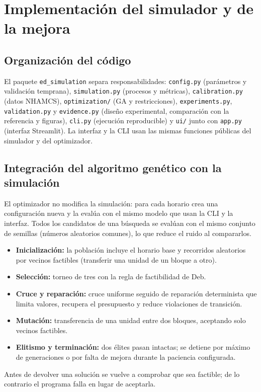 \section{Implementación del simulador y de la mejora}

\subsection{Organización del código}
El paquete \texttt{ed\_simulation} separa responsabilidades: \texttt{config.py}
(parámetros y validación temprana), \texttt{simulation.py} (procesos y métricas),
\texttt{calibration.py} (datos NHAMCS), \texttt{optimization/} (GA y restricciones),
\texttt{experiments.py}, \texttt{validation.py} y \texttt{evidence.py} (diseño
experimental, comparación con la referencia y figuras), \texttt{cli.py} (ejecución
reproducible) y \texttt{ui/} junto con \texttt{app.py} (interfaz Streamlit). La interfaz y
la CLI usan las mismas funciones públicas del simulador y del optimizador.

\subsection{Integración del algoritmo genético con la simulación}
El optimizador no modifica la simulación: para cada horario crea una configuración nueva
y la evalúa con el mismo modelo que usan la CLI y la interfaz. Todos los candidatos de una
búsqueda se evalúan con el mismo conjunto de semillas (números aleatorios comunes), lo que
reduce el ruido al compararlos.

\begin{itemize}
  \item \textbf{Inicialización:} la población incluye el horario base y recorridos
  aleatorios por vecinos factibles (transferir una unidad de un bloque a otro).
  \item \textbf{Selección:} torneo de tres con la regla de factibilidad de Deb.
  \item \textbf{Cruce y reparación:} cruce uniforme seguido de reparación determinista que
  limita valores, recupera el presupuesto y reduce violaciones de transición.
  \item \textbf{Mutación:} transferencia de una unidad entre dos bloques, aceptando solo
  vecinos factibles.
  \item \textbf{Elitismo y terminación:} dos élites pasan intactas; se detiene por máximo de
  generaciones o por falta de mejora durante la paciencia configurada.
\end{itemize}
Antes de devolver una solución se vuelve a comprobar que sea factible; de lo contrario el
programa falla en lugar de aceptarla.

